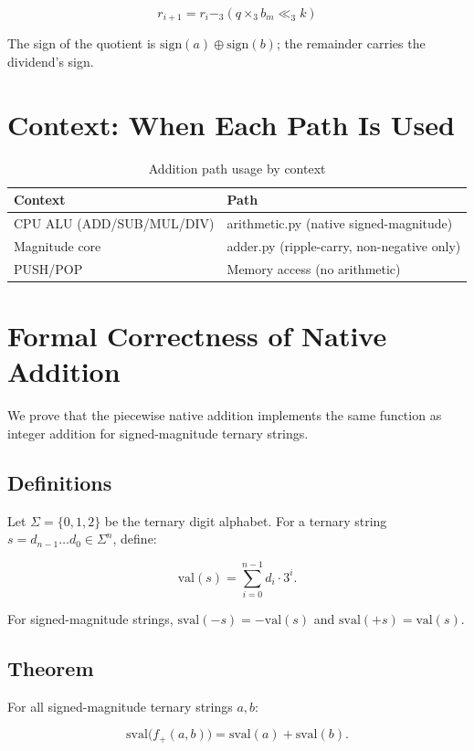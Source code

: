 \documentclass[12pt,a4paper,twoside]{book}
\theoremstyle{trinarytheorem}
\theoremstyle{trinarydefinition}
\newcommand{\code}[1]{\textsf{#1}}
\begin{document}
\[
r_{i+1} = r_i -_3 (q \times_3 b_m \ll_3 k)
\]

The sign of the quotient is $\text{sign}(a) \oplus \text{sign}(b)$; the
remainder carries the dividend's sign.

\section{Context: When Each Path Is Used}

\begin{table}[H]
\centering
\caption{Addition path usage by context}
\label{tab:addpaths}
\begin{tabular}{ll}
\toprule
Context & Path \\
\midrule
CPU ALU (ADD/SUB/MUL/DIV) & \code{arithmetic.py} (native signed-magnitude) \\
Magnitude core & \code{adder.py} (ripple-carry, non-negative only) \\
PUSH/POP & Memory access (no arithmetic) \\
\bottomrule
\end{tabular}
\end{table}

\section{Formal Correctness of Native Addition}

We prove that the piecewise native addition implements the same
function as integer addition for signed-magnitude ternary strings.

\subsection{Definitions}

Let $\Sigma = \{0,1,2\}$ be the ternary digit alphabet. For a ternary
string $s = d_{n-1} \ldots d_0 \in \Sigma^n$, define:

\[
\text{val}(s) = \sum_{i=0}^{n-1} d_i \cdot 3^i.
\]

\noindent For signed-magnitude strings, $\text{sval}(-s) = -\text{val}(s)$
and $\text{sval}(+s) = \text{val}(s)$.

\subsection{Theorem}

For all signed-magnitude ternary strings $a,b$:

\[
\text{sval}\bigl(f_+(a,b)\bigr) = \text{sval}(a) + \text{sval}(b).
\]
\end{document}
